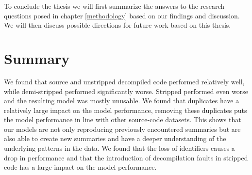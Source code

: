 To conclude the thesis we will first summarize the answers to the research questions posed in chapter \ref{methodology} based on our findings and discussion. We will then discuss possible directions for future work based on this thesis. 
\section{Summary}
We found that source and unstripped decompiled code performed relatively well, while demi-stripped performed significantly worse. Stripped performed even worse and the resulting model was mostly unusable. We found that duplicates have a relatively large impact on the model performance, removing these duplicates puts the model performance in line with other source-code datasets. This shows that our models are not only reproducing previously encountered summaries but are also able to create new summaries and have a deeper understanding of the underlying patterns in the data. We found that the loss of identifiers causes a drop in performance and that the introduction of decompilation faults in stripped code has a large impact on the model performance.

